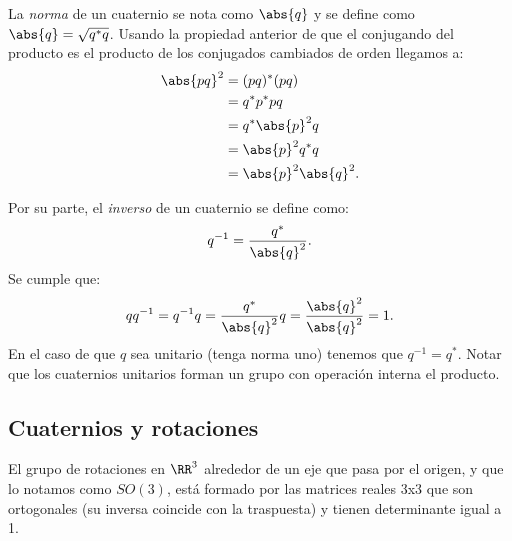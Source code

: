 			La \textit{norma} de un cuaternio se nota como $ \abs{q} $ y se define como $ \abs{q} = \sqrt{q^*q}$. Usando la propiedad anterior de que el conjugando del producto es el producto de los conjugados cambiados de orden llegamos a:
			\begin{equation*}
			\begin{split}
			\abs{pq}^2 &= (pq)^*(pq) \\
			&= q^*p^*pq \\
			&=  q^*\abs{p}^2 q \\
			&= \abs{p}^2q^*q \\
			&= \abs{p}^2\abs{q}^2.
			\end{split}
			\end{equation*}
			
			Por su parte, el \textit{inverso} de un cuaternio se define como:
			\[
			q^{-1} = \frac{q^*}{\abs{q}^2}.
			\]
			Se cumple que: 
			\[
			qq^{-1} =q^{-1}q =  \frac{q^*}{\abs{q}^2} q = \frac{\abs{q}^2}{\abs{q}^2} = 1.
			\]
			En el caso de que $ q $ sea unitario (tenga norma uno) tenemos que $ q^{-1} = q^* $. Notar que los cuaternios unitarios forman un grupo con operación interna el producto. 
			
	
		\subsection{Cuaternios y rotaciones}\label{Cuat+Rot}
		El grupo de rotaciones en $ \RR^3 $ alrededor de un eje que pasa por el origen, y que lo notamos como $ SO(3) $, está formado por las matrices reales 3x3 que son ortogonales (su inversa coincide con la traspuesta) y tienen determinante igual a 1. \\
		
